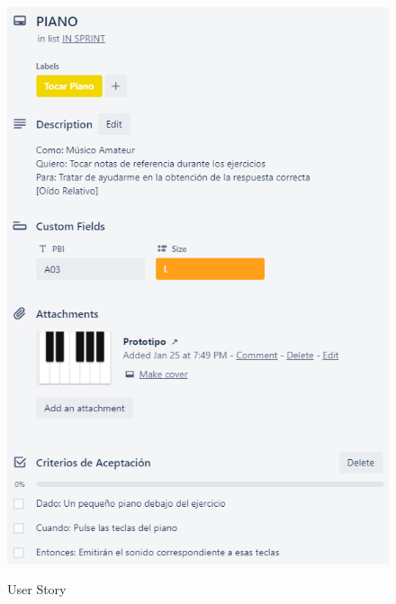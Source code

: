 \documentclass[12pt,twoside,titlepage]{report}
\begin{document}
\begin{figure}[H]
    \centering
    \includegraphics[scale=1.3]{Scrum/User Stories/Piano}
    \label{fig:Piano}
    \caption{User Story}
\end{figure}
\end{document}
